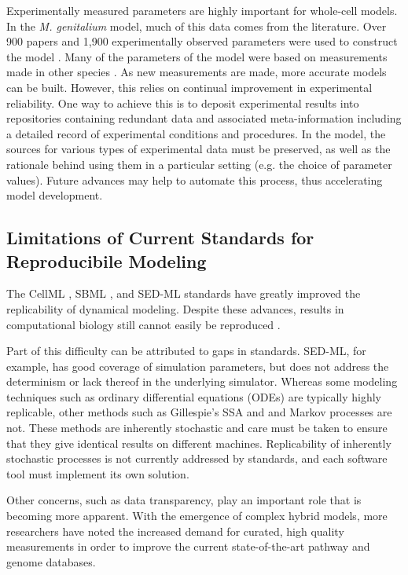 \documentclass[journal,transmag,twoside]{IEEEtran}
\begin{document}
Experimentally measured parameters are highly important for whole-cell models.
In the \textit{M. genitalium} model, much of this data comes from the literature.
Over 900 papers and 1,900 experimentally observed parameters were used to construct the model \cite{Karr2012}.
Many of the parameters of the model were based on measurements made in other species \cite{macklin2014future}.
As new measurements are made, more accurate models can be built.
However, this relies on continual improvement in experimental reliability.
One way to achieve this is to deposit experimental results into repositories
containing redundant data and associated meta-information including
a detailed record of experimental conditions and procedures.
In the model, the sources for various types of experimental data must be preserved,
as well as the rationale behind using them in a particular setting
(e.g. the choice of parameter values).
Future advances may help to automate this process, thus accelerating model development.

\subsection{Limitations of Current Standards for Reproducibile Modeling}

The CellML \cite{cuellar2003overview}, SBML \cite{hucka2003}, and SED-ML \cite{sedml2011} standards have greatly improved the replicability of dynamical modeling.
Despite these advances, results in computational biology still cannot easily be reproduced \cite{garijo2013quantifying}.

Part of this difficulty can be attributed to gaps in standards.
SED-ML, for example, has good coverage of simulation parameters, but
does not address the determinism or lack thereof in the underlying simulator.
Whereas some modeling techniques such as ordinary differential equations (ODEs)
are typically highly replicable, other methods such as Gillespie's SSA and
and Markov processes are not. These methods are inherently stochastic and care
must be taken to ensure that they give identical results on different machines.
Replicability of inherently stochastic processes is not currently addressed by standards,
and each software tool must implement its own solution.

Other concerns, such as data transparency, play an important role that is becoming more apparent.
With the emergence of complex hybrid models, more researchers have noted the increased demand for curated, high quality measurements in order to improve the current state-of-the-art pathway and genome databases.
\end{document}
